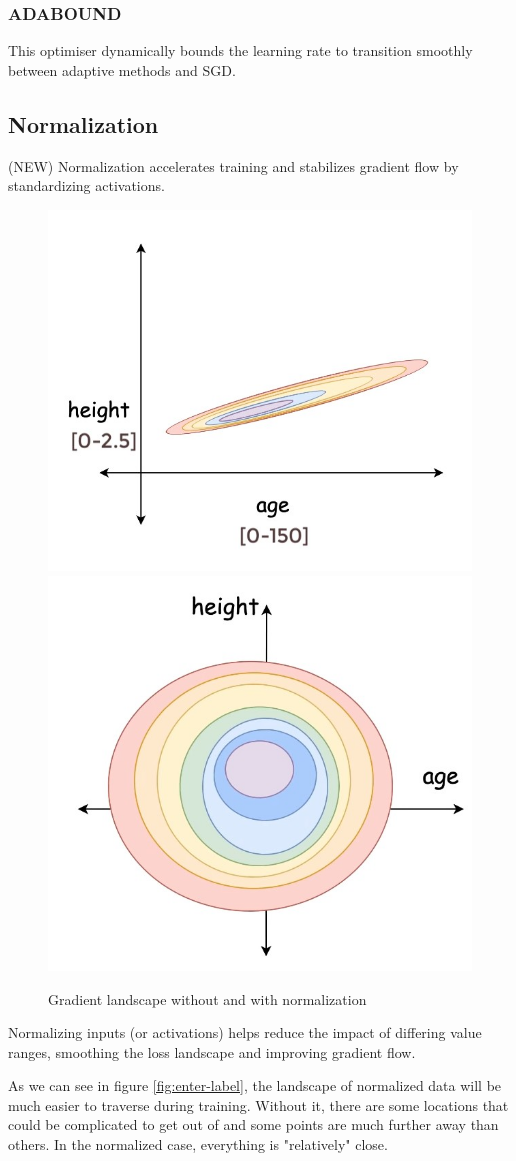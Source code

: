 \documentclass{article}
\begin{document}
\subsubsection{ADABOUND}
This optimiser dynamically bounds the learning rate to transition smoothly between adaptive methods and SGD.

\subsection{Normalization} (NEW)
Normalization accelerates training and stabilizes gradient flow by standardizing activations.

\begin{figure}
    \centering
    \includegraphics[width=0.4\linewidth]{graphics/S3Optimisation/batchnorm_exp01.jpg}
    \includegraphics[width=0.4\linewidth]{graphics/S3Optimisation/batchnorm_exp02.jpg}
    \caption{Gradient landscape without and with normalization}
    \label{fig:batchnorm}
\end{figure}

Normalizing inputs (or activations) helps reduce the impact of differing value ranges, smoothing the loss landscape and improving gradient flow.

As we can see in figure \ref{fig:enter-label}, the landscape of normalized data will be much easier to traverse during training. Without it, there are some locations that could be complicated to get out of and some points are much further away than others. In the normalized case, everything is "relatively" close.
\end{document}
